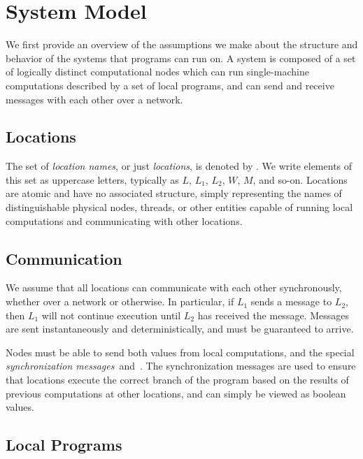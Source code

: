 \section{System Model}
\label{sec:system_model}
We first provide an overview of the assumptions we make about the structure and behavior of the systems that \langname{} programs can run on.
A system is composed of a set of logically distinct computational nodes which can run single-machine computations described by a set of local programs, and can send and receive messages with each other over a network.

\subsection{Locations}
\label{sec:locations}
The set of \emph{location names}, or just \emph{locations}, is denoted by \Locations.
We write elements of this set as uppercase letters, typically as $L$, $L_1$, $L_2$, $W$, $M$, and so-on.
Locations are atomic and have no associated structure, simply representing the names of distinguishable physical nodes, threads, or other entities capable of running local computations and communicating with other locations.

\subsection{Communication}
\label{sec:communication}
We assume that all locations can communicate with each other synchronously, whether over a network or otherwise.
In particular, if $L_1$ sends a message to $L_2$, then $L_1$ will not continue execution until $L_2$ has received the message.
Messages are sent instantaneously and deterministically, and must be guaranteed to arrive.

Nodes must be able to send both values from local computations, and the special \emph{synchronization messages}~\Left and~\Right.
The synchronization messages are used to ensure that locations execute the correct branch of the program based on the results of previous computations at other locations, and can simply be viewed as boolean values.

\subsection{Local Programs}
\label{sec:local-programs}

